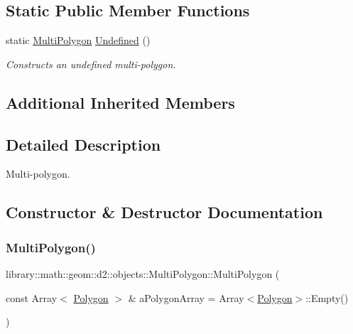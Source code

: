 \subsection*{Static Public Member Functions}
\begin{DoxyCompactItemize}
\item 
static \hyperlink{classlibrary_1_1math_1_1geom_1_1d2_1_1objects_1_1_multi_polygon}{Multi\+Polygon} \hyperlink{classlibrary_1_1math_1_1geom_1_1d2_1_1objects_1_1_multi_polygon_a92c7c7ece7479f0ac9a9b75546b69b20}{Undefined} ()
\begin{DoxyCompactList}\small\item\em Constructs an undefined multi-\/polygon. \end{DoxyCompactList}\end{DoxyCompactItemize}
\subsection*{Additional Inherited Members}


\subsection{Detailed Description}
Multi-\/polygon. 

\subsection{Constructor \& Destructor Documentation}
\mbox{\label{classlibrary_1_1math_1_1geom_1_1d2_1_1objects_1_1_multi_polygon_a10c2390027c64a8541efde7fcb2b282f}} 
\subsubsection{\texorpdfstring{Multi\+Polygon()}{MultiPolygon()}\hspace{0.1cm}{\footnotesize\ttfamily [1/2]}}
{\footnotesize\ttfamily library\+::math\+::geom\+::d2\+::objects\+::\+Multi\+Polygon\+::\+Multi\+Polygon (\begin{DoxyParamCaption}\item[{const Array$<$ \hyperlink{classlibrary_1_1math_1_1geom_1_1d2_1_1objects_1_1_polygon}{Polygon} $>$ \&}]{a\+Polygon\+Array = {\ttfamily Array$<$\hyperlink{classlibrary_1_1math_1_1geom_1_1d2_1_1objects_1_1_polygon}{Polygon}$>$\+:\+:Empty()} }\end{DoxyParamCaption})}



